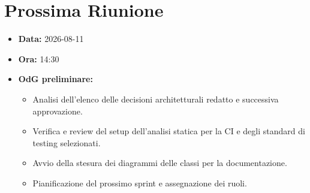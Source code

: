 \section{Prossima Riunione}
\begin{itemize}
	\item \textbf{Data:} 2026-08-11
	\item \textbf{Ora:} 14:30
	\item \textbf{OdG preliminare:}
	\begin{itemize}
		\item Analisi dell'elenco delle decisioni architetturali redatto e successiva approvazione.
		\item Verifica e review del setup dell'analisi statica per la CI e degli standard di testing selezionati.
		\item Avvio della stesura dei diagrammi delle classi per la documentazione.
		\item Pianificazione del prossimo sprint e assegnazione dei ruoli.
	\end{itemize}
\end{itemize}